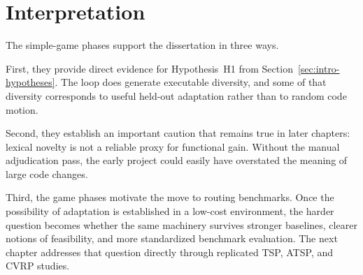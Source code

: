 \section{Interpretation}
\label{sec:games-interpretation}

The simple-game phases support the dissertation in three ways.

First, they provide direct evidence for Hypothesis~H1 from
Section~\ref{sec:intro-hypotheses}. The loop does generate executable diversity, and some of that
diversity corresponds to useful held-out adaptation rather than to random code motion.

Second, they establish an important caution that remains true in later chapters: lexical novelty is
not a reliable proxy for functional gain. Without the manual adjudication pass, the early project
could easily have overstated the meaning of large code changes.

Third, the game phases motivate the move to routing benchmarks. Once the possibility of adaptation
is established in a low-cost environment, the harder question becomes whether the same machinery
survives stronger baselines, clearer notions of feasibility, and more standardized benchmark
evaluation. The next chapter addresses that question directly through replicated TSP, ATSP, and
CVRP studies.

